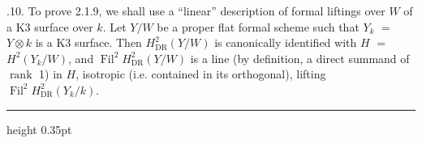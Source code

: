 \documentclass[9pt]{article}
\newcommand{\CanonText}[1]{\par{\fontsize{8.0}{9.35}\selectfont\RaggedRight #1\par}\vspace{2.2pt}}
\begin{document}
\begin{minipage}[t][\dimexpr\textheight-5pt\relax][t]{\textwidth}
\CanonText{2.1.10. To prove 2.1.9, we shall use a “linear” description of formal liftings over \(W\) of a K3 surface over \(k\). Let \(Y/W\) be a proper flat formal scheme such that \(Y_{k}\) \(=\) \(Y\otimes{}k\) is a K3 surface. Then \(H^{2}_{\mathrm{DR}}(Y/W)\) is canonically identified with \(H\) \(=\) \(H^{2}(Y_{k}/W)\), and \(\operatorname{Fil}^{2}H^{2}_{\mathrm{DR}}(Y/W)\) is a line (by definition, a direct summand of \(\operatorname{rank}\) 1) in \(H\), isotropic (i.e. contained in its orthogonal), lifting \(\operatorname{Fil}^{2}H^{2}_{\mathrm{DR}}(Y_{k}/k)\).}
\vfill
{\color{Accent}\hrule height 0.35pt}\vspace{3pt}
\end{minipage}
\newpage
\end{document}
